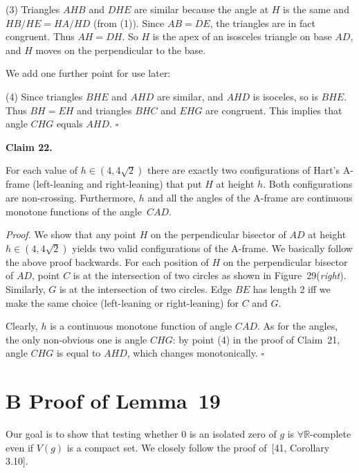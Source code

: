 \documentclass{article}
\begin{document}
(3) Triangles $AHB$ and $DHE$ are similar because the angle at $H$ is the same and $HB/HE = HA/HD$ (from (1)).  Since $AB = DE$, the triangles are in fact congruent.  Thus $AH = DH$.  So $H$ is the apex of an isosceles triangle on base $AD$, and $H$ moves on the perpendicular to the base.

We add one further point for use later:

(4) Since triangles $BHE$ and $AHD$ are similar, and $AHD$ is isoceles, so is $BHE$.  Thus $BH=EH$ and triangles $BHC$ and $EHG$ are congruent.  This implies that angle $CHG$ equals $AHD$.
\hfill$\square$\par\medskip

\par\medskip\noindent\textbf{Claim 22.} \begin{itshape}
For each value of $h \in (4,4 \sqrt{2})$ there are exactly two configurations of Hart's A-frame (left-leaning and right-leaning) that put $H$ at height $h$. Both configurations are non-crossing. Furthermore, 
$h$ 
and all the angles of the A-frame are  continuous monotone functions of the angle~$CAD$.
\end{itshape}\par\medskip
\par\noindent\textit{Proof.}  
We show that any point $H$ on the perpendicular bisector of $AD$ at height $h \in (4,4 \sqrt{2})$ yields two valid configurations of the A-frame.  We basically follow the above proof backwards. 
For each position of $H$ on the perpendicular bisector of $AD$, point $C$ is at the intersection of two circles as shown in Figure~29(\emph{right}). 
Similarly, $G$ is at the intersection of two circles. 
Edge 
$BE$ has length 2 iff we make the same choice (left-leaning or right-leaning) for $C$ and $G$.  

Clearly, $h$ is a continuous monotone function of angle $CAD$. As for the angles, the only non-obvious one is angle $CHG$: by point (4) in the proof of Claim~21, angle $CHG$ is equal to $AHD$, which changes monotonically.  
\hfill$\square$\par\medskip

\section*{B Proof of Lemma~19}

Our goal is to show that testing whether $0$ is an isolated zero of $g$ is \ensuremath{\forall\mathbb{R}}-complete even if $V(g)$ is a compact set. We closely follow the proof of~[41, Corollary 3.10].
\end{document}
